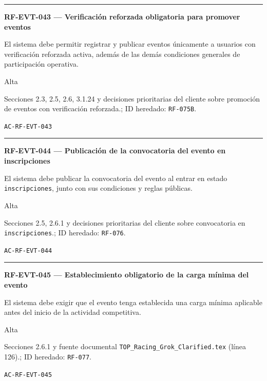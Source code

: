 \documentclass[10pt,letterpaper]{article}
\begin{document}
\vspace{0.25em}\hrule\vspace{0.65em}
\noindent\textbf{RF-EVT-043 --- Verificación reforzada obligatoria para promover eventos}\par
\begin{description}[style=nextline,leftmargin=3.15cm,labelwidth=2.8cm,font=\normalfont\bfseries]
\item[Obligación] El sistema debe permitir registrar y publicar eventos únicamente a usuarios con verificación reforzada activa, además de las demás condiciones generales de participación operativa.
\item[Prioridad] Alta
\item[Procedencia] Secciones 2.3, 2.5, 2.6, 3.1.24 y decisiones prioritarias del cliente sobre promoción de eventos con verificación reforzada.; ID heredado: \texttt{RF-075B}.
\item[Verificación] \texttt{AC-RF-EVT-043}
\end{description}
\vspace{0.25em}\hrule\vspace{0.65em}
\noindent\textbf{RF-EVT-044 --- Publicación de la convocatoria del evento en inscripciones}\par
\begin{description}[style=nextline,leftmargin=3.15cm,labelwidth=2.8cm,font=\normalfont\bfseries]
\item[Obligación] El sistema debe publicar la convocatoria del evento al entrar en estado \texttt{inscripciones}, junto con sus condiciones y reglas públicas.
\item[Prioridad] Alta
\item[Procedencia] Secciones 2.5, 2.6.1 y decisiones prioritarias del cliente sobre convocatoria en \texttt{inscripciones}.; ID heredado: \texttt{RF-076}.
\item[Verificación] \texttt{AC-RF-EVT-044}
\end{description}
\vspace{0.25em}\hrule\vspace{0.65em}
\noindent\textbf{RF-EVT-045 --- Establecimiento obligatorio de la carga mínima del evento}\par
\begin{description}[style=nextline,leftmargin=3.15cm,labelwidth=2.8cm,font=\normalfont\bfseries]
\item[Obligación] El sistema debe exigir que el evento tenga establecida una carga mínima aplicable antes del inicio de la actividad competitiva.
\item[Prioridad] Alta
\item[Procedencia] Secciones 2.6.1 y fuente documental \texttt{TOP\_Racing\_Grok\_Clarified.tex} (línea 126).; ID heredado: \texttt{RF-077}.
\item[Verificación] \texttt{AC-RF-EVT-045}
\end{description}
\end{document}
